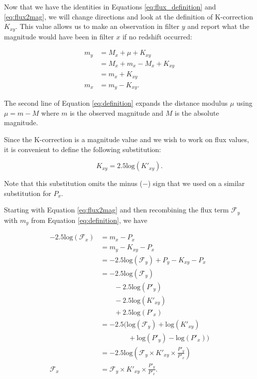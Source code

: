 \documentclass[aps,prl,reprint,amsmath]{revtex4-2}
\begin{document}
Now that we have the identities in Equations \ref{eq:flux_definition} and
\ref{eq:flux2mag}, we will change directions and look at the definition of
K-correction $K_{xy}$. This value allows us to make an observation in filter
$y$ and report what the magnitude would have been in filter $x$ if no redshift
occurred:

\begin{equation}
\begin{aligned}
\label{eq:definition}
  m_y &= M_x + \mu + K_{xy} \\
      &= M_x + m_x - M_x + K_{xy} \\
      &= m_x + K_{xy} \\
  m_x &= m_y - K_{xy} .
\end{aligned}
\end{equation}

\noindent The second line of Equation \ref{eq:definition} expands the distance modulus
$\mu$ using $\mu = m - M$ where $m$ is the observed magnitude and $M$ is the
absolute magnitude.

Since the K-correction is a magnitude value and we wish to work on flux values,
it is convenient to define the following substitution:

\begin{equation}
\label{eq:k_substitution}
  K_{xy} = 2.5\text{log}(K'_{xy}) .
\end{equation}

\noindent Note that this substitution omits the minus ($-$) sign that we used on a
similar substitution for $P_x$.

Starting with Equation \ref{eq:flux2mag} and then
recombining the flux term $\mathcal{F}_y$ with $m_y$ from Equation
\ref{eq:definition}, we have

\begin{equation}
\begin{aligned}
\label{eq:as_flux}
  -2.5 \text{log}(\mathcal{F}_x)
      &= m_x - P_x \\
      &= m_y - K_{xy} - P_x \\
      &= -2.5 \text{log}(\mathcal{F}_y) + P_y - K_{xy} - P_x \\
      &= -2.5 \text{log}(\mathcal{F}_y) \\
         &\qquad - 2.5 \text{log}(P'_y) \\
         &\qquad - 2.5 \text{log}(K'_{xy}) \\
         &\qquad + 2.5 \text{log}(P'_x) \\
      &= -2.5 \biggl(\text{log}(\mathcal{F}_y) + \text{log}(K'_{xy}) \\
         &\qquad\qquad + \text{log}(P'_y) - \text{log}(P'_x)
        \biggr) \\
      &= -2.5 \text{log}\left(
        \mathcal{F}_y
        \times K'_{xy}
        \times \frac{P'_y}{P'_x}\right) \\
  \mathcal{F}_x &= \mathcal{F}_y \times K'_{xy} \times \frac{P'_y}{P'_x}.
\end{aligned}
\end{equation}
\end{document}

